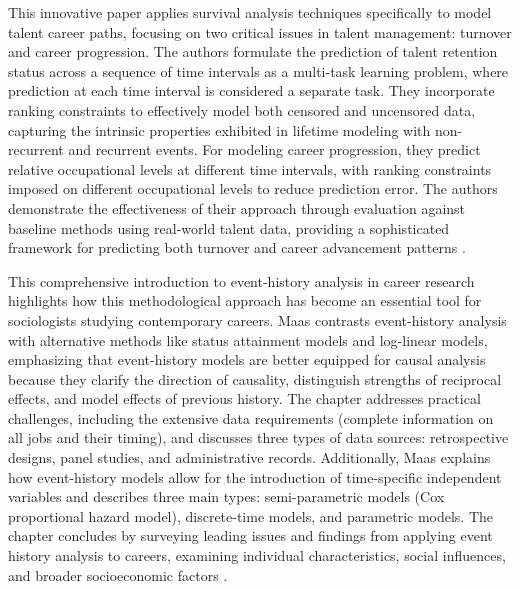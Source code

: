 \documentclass[../main.tex]{subfiles}
\begin{document}
This innovative paper applies survival analysis techniques specifically to model talent career paths, focusing on two critical issues in talent management: turnover and career progression. The authors formulate the prediction of talent retention status across a sequence of time intervals as a multi-task learning problem, where prediction at each time interval is considered a separate task. They incorporate ranking constraints to effectively model both censored and uncensored data, capturing the intrinsic properties exhibited in lifetime modeling with non-recurrent and recurrent events. For modeling career progression, they predict relative occupational levels at different time intervals, with ranking constraints imposed on different occupational levels to reduce prediction error. The authors demonstrate the effectiveness of their approach through evaluation against baseline methods using real-world talent data, providing a sophisticated framework for predicting both turnover and career advancement patterns \parencite{li2016prospecting}.

This comprehensive introduction to event-history analysis in career research highlights how this methodological approach has become an essential tool for sociologists studying contemporary careers. Maas contrasts event-history analysis with alternative methods like status attainment models and log-linear models, emphasizing that event-history models are better equipped for causal analysis because they clarify the direction of causality, distinguish strengths of reciprocal effects, and model effects of previous history. The chapter addresses practical challenges, including the extensive data requirements (complete information on all jobs and their timing), and discusses three types of data sources: retrospective designs, panel studies, and administrative records. Additionally, Maas explains how event-history models allow for the introduction of time-specific independent variables and describes three main types: semi-parametric models (Cox proportional hazard model), discrete-time models, and parametric models. The chapter concludes by surveying leading issues and findings from applying event history analysis to careers, examining individual characteristics, social influences, and broader socioeconomic factors \parencite{maas2003use}.
\end{document}
